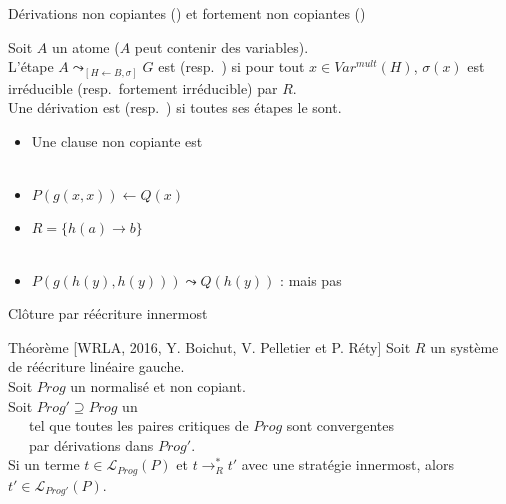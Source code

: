 \begin{frame}{Dérivations non copiantes (\nc) et fortement non copiantes (\snc)}
  \begin{Definition}
    Soit $A$ un atome ($A$ peut contenir des variables).\\
    L'étape $A \leadsto_{[H\leftarrow B,\sigma]} G$ est \nc (resp.\ \snc) si
    pour tout $x \in Var^{mult}(H)$, $\sigma(x)$ est irréducible (resp.\ fortement irréducible) par $R$.\\
    Une dérivation est \nc (resp.\ \snc) si toutes ses étapes le sont.
  \end{Definition}
  \begin{itemize}[<+->]
  \item Une clause non copiante est \snc \\~
    
  \item $P(g(x,x)) \leftarrow Q(x)$
  \item $R = \{h(a) \rightarrow b\}$ \\~

  \item $P(g(h(y),h(y))) \leadsto Q(h(y))$ : \nc mais pas \snc
  \end{itemize}
\end{frame}

\begin{frame}{Clôture par réécriture innermost}
  \begin{alertblock}{Théorème [WRLA, 2016, Y. Boichut, V. Pelletier et P. Réty]}
    Soit $R$ un système de réécriture linéaire gauche.\\
    \pause
    Soit $Prog$ un \csprogramme normalisé et non copiant.\\
    \pause
    Soit $Prog' \supseteq Prog$ un \csprogramme \\
    \pause
    ~~~tel que toutes les paires critiques de $Prog$ sont convergentes\\
    ~~~par dérivations \snc dans $Prog'$.\\
    \pause
    Si un terme $t \in \mathcal{L}_{Prog}(P)$ et $t \rightarrow^*_R t'$ avec une stratégie innermost, alors $t' \in \mathcal L_{Prog'}(P)$.
  \end{alertblock}
\end{frame}
